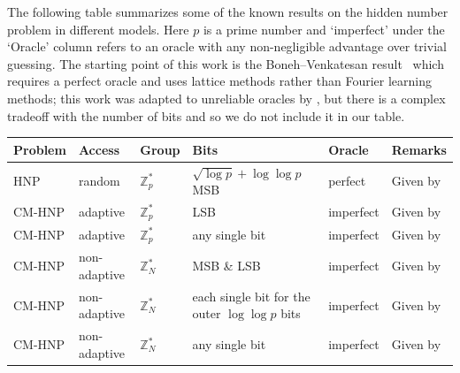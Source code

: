 \documentclass[11pt]{article}
\theoremstyle{definition}
\newcommand{\Z}{\mathbb{Z}}
\begin{document}
The following table summarizes some of the known results on the hidden number problem in different models. Here $p$ is a prime number and `imperfect' under the `Oracle' column refers to an oracle with any non-negligible advantage over trivial guessing.
The starting point of this work is the Boneh--Venkatesan result~\cite{BV} which requires a perfect oracle and uses lattice methods rather than Fourier learning methods; this work was adapted to unreliable oracles by \cite{GVNS}, but there is a complex  tradeoff with the number of bits and so we do not include it in our table.

\begin{center}
    \begin{tabular}{ | l | l | l | p{4.8cm} | l | l |}
        \hline
        Problem & Access       & Group    & Bits                                            & Oracle    & Remarks                        \\ \hline
        HNP     & random       & $\Z^*_p$ & $\sqrt{\log p} + \log\log p$ MSB\footnotemark   & perfect   & Given by \cite{BV}             \\ \hline
        CM-HNP  & adaptive     & $\Z^*_p$ & LSB                                             & imperfect & Given by \cite{ACGS}           \\ \hline
        CM-HNP  & adaptive     & $\Z^*_p$ & any single bit                                  & imperfect & Given by \cite{HN}             \\ \hline
        CM-HNP  & non-adaptive & $\Z^*_N$ & MSB \& LSB                                      & imperfect & Given by \cite{Bleichenbacher} \\ \hline
        CM-HNP  & non-adaptive & $\Z^*_N$ & each single bit for the outer $\log\log p$ bits & imperfect & Given by \cite{AGS}            \\ \hline
        CM-HNP  & non-adaptive & $\Z^*_N$ & any single bit                                  & imperfect & Given by \cite{MR}             \\ \hline
    \end{tabular}
\end{center}
\end{document}
